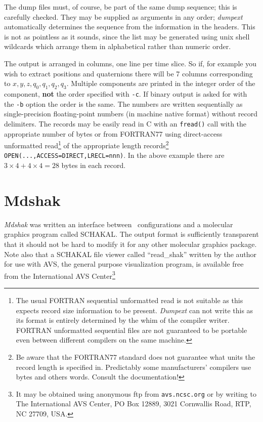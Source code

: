 The dump files must, of course, be part of the same dump sequence;
this is carefully checked.  They may be supplied as arguments in any
order; {\em dumpext\/} automatically determines the sequence from
the information in the headers.  This is not as pointless as it sounds,
since the list may be generated using unix shell wildcards which arrange
them in alphabetical rather than numeric order.

The output is arranged in columns, one line per time slice.  So if,
for example you wish to extract positions and quaternions there will
be 7 columns corresponding to $x,y,z,q_0,q_1,q_2,q_3$. Multiple
components are printed in the integer order of the component, {\bf
not} the order specified with \verb'-c'. If binary output is asked for
with the \verb'-b' option the order is the same. The numbers are
written sequentially as single-precision floating-point numbers (in
machine native format) without record delimiters.  The records may be
easily read in C with an
\verb'fread()' call with the appropriate number of bytes or from
FORTRAN77 using direct-access unformatted read\footnote{The usual
FORTRAN sequential unformatted read is not suitable as this expects
record size information to be present.  {\em Dumpext\/} can not
write this as its format is entirely determined by the whim of the
compiler writer.  FORTRAN unformatted sequential files are not
guaranteed to be portable even between different compilers on the same
machine.} of the appropriate length records\footnote{Be aware that the
FORTRAN77 standard does not guarantee what units the record length is
specified in.  Predictably some manufacturers' compilers use bytes and
others words.  Consult the documentation!}
\verb'OPEN(...,ACCESS=DIRECT,LRECL=nnn)'.  In the above example there are
$3 \times 4 + 4 \times 4 = 28$ bytes in each record.
\section{Mdshak}%
{\em Mdshak\/} was written an interface between \moldy\ configurations
and a molecular graphics program called SCHAKAL\cite{schakal:88}.  The
output format is sufficiently transparent that it should not be hard
to modify it for any other molecular graphics package.  Note also that
a SCHAKAL file viewer called ``read\_shak'' written by the author for
use with AVS, the general purpose visualization program, is available
free from the International AVS Center\footnote{It may be obtained
using anonymous ftp from \verb'avs.ncsc.org' or by writing to The
International AVS Center, PO Box 12889, 3021 Cornwallis Road, RTP, NC
27709, USA.}

